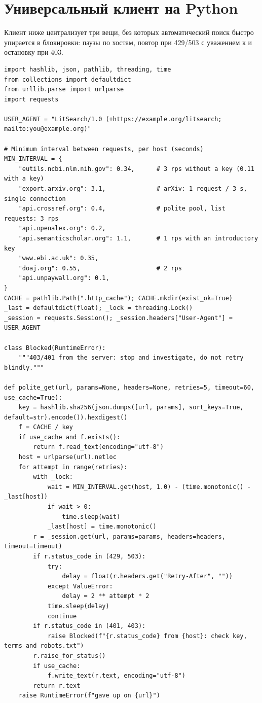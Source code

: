 \documentclass[11pt,a4paper]{article}
\newcommand{\code}[1]{\texttt{\detokenize{#1}}}
\begin{document}
\section{Универсальный клиент на Python}

Клиент ниже централизует три вещи, без которых автоматический поиск быстро упирается в блокировки: паузы по хостам, повтор при 429/503 с уважением к \code{Retry-After} и остановку при 403.

\begin{lstlisting}[caption={Вежливый HTTP-клиент с паузами по хостам, повторами и кэшем}]
import hashlib, json, pathlib, threading, time
from collections import defaultdict
from urllib.parse import urlparse
import requests

USER_AGENT = "LitSearch/1.0 (+https://example.org/litsearch; mailto:you@example.org)"

# Minimum interval between requests, per host (seconds)
MIN_INTERVAL = {
    "eutils.ncbi.nlm.nih.gov": 0.34,      # 3 rps without a key (0.11 with a key)
    "export.arxiv.org": 3.1,              # arXiv: 1 request / 3 s, single connection
    "api.crossref.org": 0.4,              # polite pool, list requests: 3 rps
    "api.openalex.org": 0.2,
    "api.semanticscholar.org": 1.1,       # 1 rps with an introductory key
    "www.ebi.ac.uk": 0.35,
    "doaj.org": 0.55,                     # 2 rps
    "api.unpaywall.org": 0.1,
}
CACHE = pathlib.Path(".http_cache"); CACHE.mkdir(exist_ok=True)
_last = defaultdict(float); _lock = threading.Lock()
_session = requests.Session(); _session.headers["User-Agent"] = USER_AGENT

class Blocked(RuntimeError):
    """403/401 from the server: stop and investigate, do not retry blindly."""

def polite_get(url, params=None, headers=None, retries=5, timeout=60, use_cache=True):
    key = hashlib.sha256(json.dumps([url, params], sort_keys=True, default=str).encode()).hexdigest()
    f = CACHE / key
    if use_cache and f.exists():
        return f.read_text(encoding="utf-8")
    host = urlparse(url).netloc
    for attempt in range(retries):
        with _lock:
            wait = MIN_INTERVAL.get(host, 1.0) - (time.monotonic() - _last[host])
            if wait > 0:
                time.sleep(wait)
            _last[host] = time.monotonic()
        r = _session.get(url, params=params, headers=headers, timeout=timeout)
        if r.status_code in (429, 503):
            try:
                delay = float(r.headers.get("Retry-After", ""))
            except ValueError:
                delay = 2 ** attempt * 2
            time.sleep(delay)
            continue
        if r.status_code in (401, 403):
            raise Blocked(f"{r.status_code} from {host}: check key, terms and robots.txt")
        r.raise_for_status()
        if use_cache:
            f.write_text(r.text, encoding="utf-8")
        return r.text
    raise RuntimeError(f"gave up on {url}")


\end{lstlisting}
\end{document}
